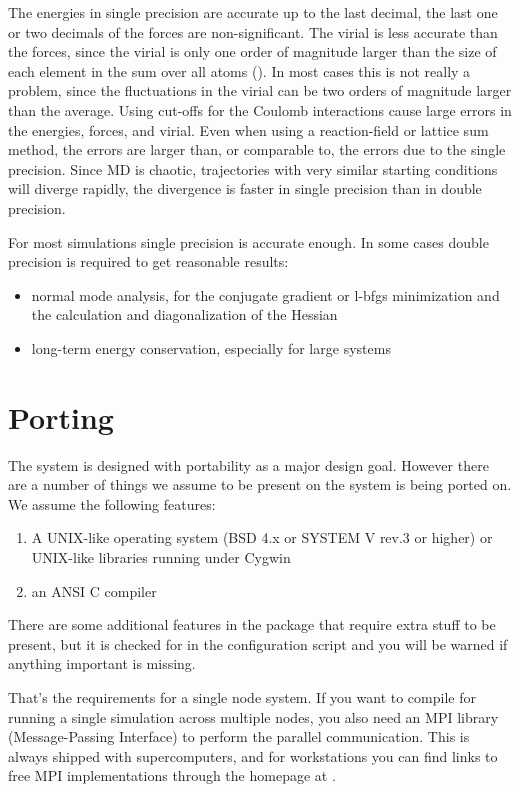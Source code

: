 The energies in single precision are accurate up to the last decimal,
the last one or two decimals of the forces are non-significant.
The virial is less accurate than the forces, since the virial is only one
order of magnitude larger than the size of each element in the sum over
all atoms ().
In most cases this is not really a problem, since the fluctuations in the
virial can be two orders of magnitude larger than the average.
Using cut-offs for the Coulomb interactions cause large errors
in the energies, forces, and virial.
Even when using a reaction-field or lattice sum method, the errors
are larger than, or comparable to, the errors due to the single precision.
Since MD is chaotic, trajectories with very similar starting conditions will
diverge rapidly, the divergence is faster in single precision than in double
precision.

For most simulations single precision is accurate enough.
In some cases double precision is required to get reasonable results:
\begin{itemize}
\item normal mode analysis,
for the conjugate gradient or l-bfgs minimization and the calculation and
diagonalization of the Hessian
\item long-term energy conservation, especially for large systems
\end{itemize}

\section{Porting {\gromacs}}
The {\gromacs} system is designed with portability as a major design
goal. However there are a number of things we assume to be present on
the system {\gromacs} is being ported on. We assume the following
features:

\begin{enumerate}
\item   A UNIX-like operating system (BSD 4.x or SYSTEM V rev.3 or higher) 
        or UNIX-like libraries running under {\eg} Cygwin
\item   an ANSI C compiler 
\end{enumerate}

There are some additional features in the package that require extra
stuff to be present, but it is checked for in the configuration script
and you will be warned if anything important is missing.

That's the requirements for a single node system. If you want
to compile {\gromacs} for running a single simulation across multiple nodes,
you also need an MPI library (Message-Passing Interface) to perform the 
parallel communication. This is always shipped with supercomputers, and
for workstations you can find links to free MPI implementations through
the {\gromacs} homepage at {\wwwpage}.


